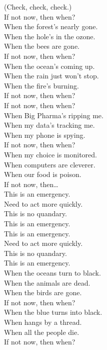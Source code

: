 
\label{album:lw}





(Check, check, check.) \\

If not now, then when? \\
When the forest's nearly gone. \\
When the hole's in the ozone. \\
When the bees are gone. \\
If not now, then when? \\
When the ocean's coming up. \\
When the rain just won't stop. \\
When the fire's burning. \\
If not now, then when? \\

If not now, then when? \\
When Big Pharma's ripping me. \\
When my data's tracking me. \\
When my phone is spying. \\
If not now, then when? \\
When my choice is monitored. \\
When computers are cleverer. \\
When our food is poison. \\
If not now, then… \\

This is an emergency. \\
Need to act more quickly. \\
This is no quandary. \\
This is an emergency. \\

This is an emergency. \\
Need to act more quickly. \\
This is no quandary. \\
This is an emergency. \\

When the oceans turn to black. \\
When the animals are dead. \\
When the birds are gone. \\
If not now, then when? \\
When the blue  turns into black. \\
When  hangs by a thread. \\
When all the people die. \\
If not now, then when? \\


